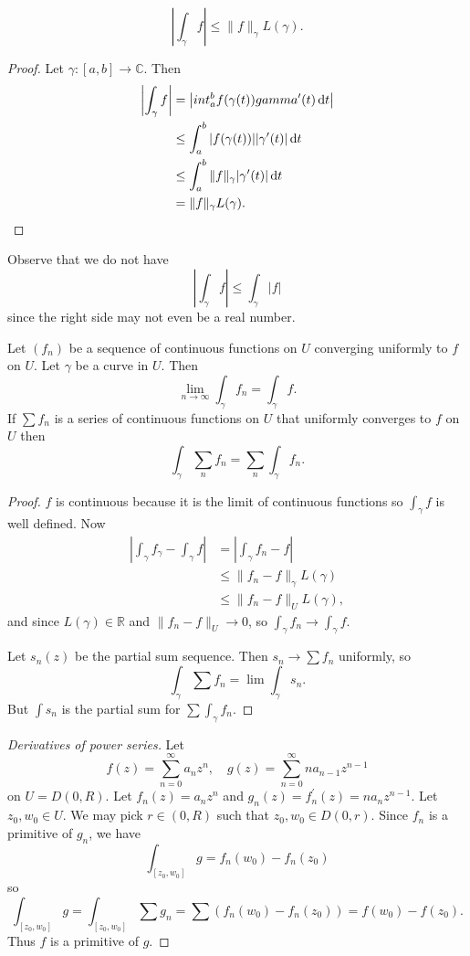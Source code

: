 \begin{lemma}
$$
\left| \int_\gamma f \right| \leq \| f \|_\gamma L(\gamma).
$$
\end{lemma}
\begin{proof}
Let $\gamma : [a, b] \to \mathbb{C}$. Then
\begin{align*}
      \left| \int_\gamma f \right|
&=    \left| int_a^b f(\gamma(t)) gamma^\prime(t) \mathop{}\!\mathrm{d} t \right| \\
&\leq \int_a^b |f(\gamma(t))| |\gamma^\prime(t)| \mathop{}\!\mathrm{d} t \\
&\leq \int_a^b \| f \|_\gamma |\gamma^\prime(t)| \mathop{}\!\mathrm{d} t \\
&=    \| f \|_\gamma L(\gamma).
\end{align*}
\end{proof}

Observe that we do not have
$$
\left| \int_\gamma f \right| \leq \int_\gamma |f|
$$
since the right side may not even be a real number.

\begin{theorem}
Let $(f_n)$ be a sequence of continuous functions on $U$
converging uniformly to $f$ on $U$. Let $\gamma$ be a curve in $U$.
Then
$$
\lim_{n \to \infty} \int_\gamma f_n = \int_\gamma f.
$$
If $\sum f_n$ is a series of continuous functions on $U$ that
uniformly converges to $f$ on $U$ then
$$
\int_\gamma \sum_n f_n = \sum_n \int_\gamma f_n.
$$
\end{theorem}
\begin{proof}
$f$ is continuous because it is the limit of continuous functions so
$\int_\gamma f$ is well defined. Now
\begin{align*}
      \left| \int_\gamma f_\gamma - \int_\gamma f \right|
&=    \left| \int_\gamma f_n - f \right| \\
&\leq \| f_n - f \|_\gamma L(\gamma) \\
&\leq \| f_n - f \|_U L(\gamma),
\end{align*}
and since $L(\gamma) \in \mathbb{R}$ and $\| f_n - f \|_U \to 0$, so
$\int_\gamma f_n \to \int_\gamma f$.

Let $s_n(z)$ be the partial sum sequence. Then $s_n \to \sum f_n$ uniformly,
so
$$
\int_\gamma \sum f_n = \lim \int_\gamma s_n.
$$
But $\int s_n$ is the partial sum for $\sum \int_\gamma f_n$.
\end{proof}

\begin{proof}[Derivatives of power series]
Let
$$
f(z) = \sum_{n=0}^\infty a_n z^n, \quad
g(z) = \sum_{n=0}^\infty n a_{n-1} z^{n-1}
$$
on $U = D(0, R)$. Let $f_n(z) = a_n z^n$ and
$g_n(z) = f_n^\prime(z) = n a_n z^{n-1}$. Let $z_0, w_0 \in U$.
We may pick $r \in (0, R)$ such that $z_0, w_0 \in D(0, r)$.
Since $f_n$ is a primitive of $g_n$, we have
$$
\int_{[z_0, w_0]} g = f_n(w_0) - f_n(z_0)
$$
so
$$
\int_{[z_0, w_0]} g = \int_{[z_0, w_0]} \sum g_n
=
\sum (f_n(w_0) - f_n(z_0))
=
f(w_0) - f(z_0).
$$
Thus $f$ is a primitive of $g$.
\end{proof}

